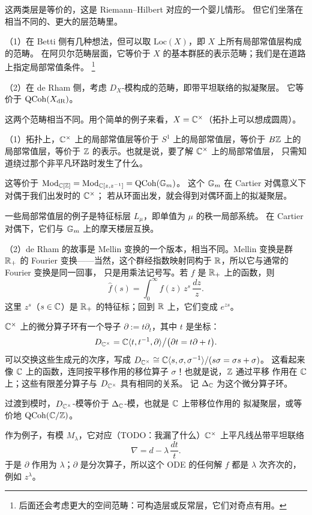 这两类层是等价的，这是 Riemann–Hilbert 对应的一个婴儿情形。
但它们坐落在相当不同的、更大的层范畴里。

（1）在 Betti 侧有几种想法，但可以取 $\mathrm{Loc}(X)$，即 $X$ 上所有局部常值层构成的范畴。
在阿贝尔范畴层面，它等价于 $X$ 的基本群胚的表示范畴；我们是在道路上指定局部常值条件。
\footnote{后面还会考虑更大的空间范畴：可构造层或反常层，它们对奇点有用。}

（2）在 de Rham 侧，考虑 $D_X$-模构成的范畴，即带平坦联络的拟凝聚层。
它等价于 $\mathrm{QCoh}(X_{\mathrm{dR}})$。

这两个范畴相当不同。用个简单的例子来看，$X=\mathbb{C}^\times$（拓扑上可以想成圆周）。

（1）拓扑上，$\mathbb{C}^\times$ 上的局部常值层等价于 $S^1$ 上的局部常值层，等价于
$B\mathbb{Z}$ 上的局部常值层，等价于 $\mathbb{Z}$ 的表示。也就是说，要了解 $\mathbb{C}^\times$ 上的局部常值层，
只需知道绕过那个非平凡环路时发生了什么。

这等价于 $\mathrm{Mod}_{\mathbb{C}[\mathbb{Z}]}=\mathrm{Mod}_{\mathbb{C}[z,z^{-1}]}=\mathrm{QCoh}(\mathbb{G}_m)$。
这个 $\mathbb{G}_m$ 在 Cartier 对偶意义下对偶于我们出发时的 $\mathbb{C}^\times$；
若从环面出发，就会得到对偶环面上的拟凝聚层。

一些局部常值层的例子是特征标层 $L_\mu$，即单值为 $\mu$ 的秩一局部系统。
在 Cartier 对偶下，它们与 $\mathbb{G}_m$ 上的摩天楼层互换。

（2）de Rham 的故事是 Mellin 变换的一个版本，相当不同。Mellin 变换是群 $\mathbb{R}_+$ 的
Fourier 变换——当然，这个群经指数映射同构于 $\mathbb{R}$，所以它与通常的 Fourier 变换是同一回事，
只是用乘法记号写。若 $f$ 是 $\mathbb{R}_+$ 上的函数，则
\[
\hat{f}(s)=\int_0^\infty f(z)\,z^s\,\frac{dz}{z}.
\]
这里 $z^s$（$s\in\mathbb{C}$）是 $\mathbb{R}_+$ 的特征标；回到 $\mathbb{R}$ 上，它们变成 $e^{zs}$。

$\mathbb{C}^\times$ 上的微分算子环有一个导子 $\partial:=t\partial_t$，其中 $t$ 是坐标：
\[
D_{\mathbb{C}^\times}=\mathbb{C}\langle t,t^{-1},\partial\rangle\big/
\bigl(\partial t=t\partial+t\bigr).
\]
可以交换这些生成元的次序，写成
$D_{\mathbb{C}^\times}\cong\mathbb{C}\langle s,\sigma,\sigma^{-1}\rangle/(s\sigma=\sigma s+\sigma)$。
这看起来像 $\mathbb{C}$ 上的函数，连同按平移作用的移位算子 $\sigma$！也就是说，$\mathbb{Z}$ 通过平移
作用在 $\mathbb{C}$ 上；这些有限差分算子与 $D_{\mathbb{C}^\times}$ 具有相同的关系。
记 $\Delta_{\mathbb{C}}$ 为这个微分算子环。

过渡到模时，$D_{\mathbb{C}^\times}$-模等价于 $\Delta_{\mathbb{C}}$-模，也就是 $\mathbb{C}$ 上带移位作用的
拟凝聚层，或等价地 $\mathrm{QCoh}(\mathbb{C}/\mathbb{Z})$。

作为例子，有模 $M_\lambda$，它对应（TODO：我漏了什么）$\mathbb{C}^\times$ 上平凡线丛带平坦联络
\[
\nabla=d-\lambda\,\frac{dt}{t}.
\]
于是 $\partial$ 作用为 $\lambda$；$\partial$ 是分次算子，所以这个 ODE 的任何解 $f$
都是 $\lambda$ 次齐次的，例如 $z^\lambda$。

